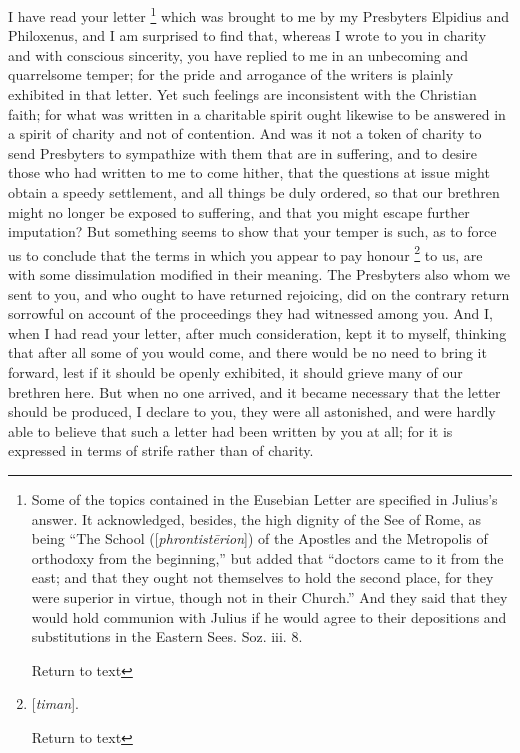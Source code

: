 I have read your letter \footnote{Some of the topics contained in the Eusebian Letter are specified in
Julius's answer. It acknowledged, besides, the high dignity of the See
of Rome, as being ``The School ([\emph{phrontist\={e}rion}]) of the
Apostles and the Metropolis of orthodoxy from the beginning,'' but
added that ``doctors came to it from the east; and that they ought not
themselves to hold the second place, for they were superior in virtue,
though not in their Church.'' And they said that they would hold
communion with Julius if he would agree to their depositions and
substitutions in the Eastern Sees. Soz. iii. 8.

Return to text} which was brought to me by my Presbyters Elpidius and
Philoxenus, and I am surprised to find that, whereas I wrote to you in
charity and with conscious sincerity, you have replied to me in an
unbecoming and quarrelsome temper; for the pride and arrogance of the
writers is plainly exhibited in that letter. Yet such feelings are
inconsistent with the Christian faith; for what was written in a
charitable spirit ought likewise to be answered in a spirit of charity
and not of contention. And was it not a token of charity to send
Presbyters to sympathize with them that are in suffering, and to
desire those who had written to me to come hither, that the questions
at issue might obtain a speedy settlement, and all things be duly
ordered, so that our brethren might no longer be exposed to suffering,
and that you might escape further imputation? But something seems to
show that your temper is such, as to force us to conclude that the
terms in which you appear to pay honour \footnote{[\emph{timan}].

Return to text} to us, are with some dissimulation modified in their meaning.
The Presbyters also whom we sent to you, and who ought to have
returned rejoicing, did on the contrary return sorrowful on account of
the proceedings they had witnessed among you. And I, when I had read
your letter, after much consideration, kept it to myself, thinking
that after all some of you would come, and there would be no need to
bring it forward, lest if it should be openly exhibited, it should
grieve many of our brethren here. But when no one arrived, and it
became necessary that the letter should be produced, I declare to you,
they were all astonished, and were hardly able to believe that such a
letter had been written by you at all; for it is expressed in terms of
strife rather than of charity.

